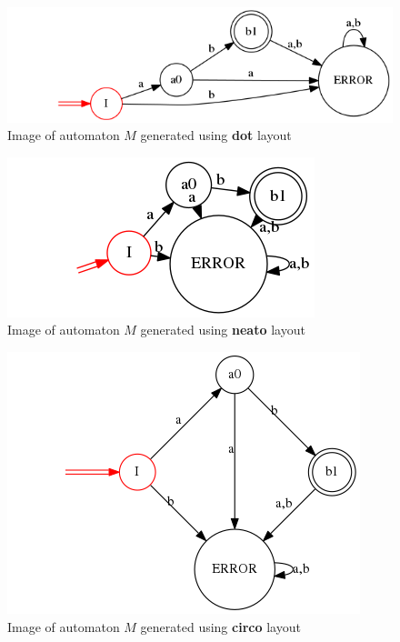 \documentclass{ctuthesis}
\begin{document}
\begin{figure}[H]
\includegraphics[width=0.8\linewidth]{figures/layouts_dot.png}
\caption{Image of automaton $M$ generated using \textbf{dot} layout}
\label{fig:layout_diff_dot}
\end{figure}

\begin{figure}[H]
\includegraphics[width=0.7\linewidth]{figures/layouts_neato.png}
\caption{Image of automaton $M$ generated using \textbf{neato} layout}
\label{fig:layout_diff_neato}
\end{figure}

\begin{figure}[H]
\includegraphics[width=0.7\linewidth]{figures/layouts_circo.png}
\caption{Image of automaton $M$ generated using \textbf{circo} layout}
\label{fig:layout_diff_circo}
\end{figure}
\end{document}
